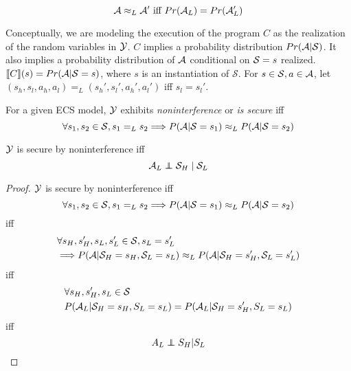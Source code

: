 \documentclass[../thesis.tex]{subfiles}
\begin{document}
\begin{dfn}
  $$\mathcal{A} \approx_L \mathcal{A}' \text{ iff } Pr(\mathcal{A}_L) = Pr
  (\mathcal{A}_L')$$
\end{dfn}

Conceptually, we are modeling the execution of the
program $C$ as the realization of the random variables in
$\mathcal{Y}$.
$C$ implies a probability distribution $Pr(\mathcal{A} \vert \mathcal{S})$.
It also implies a probability distribution of $\mathcal{A}$
conditional on $\mathcal{S} = s$ realized.
$\llbracket C\rrbracket(s) = Pr(\mathcal{A} \vert \mathcal{S} = s)$, where $s$ is an instantiation of $\mathcal{S}$.
For $s \in \mathcal{S}, a \in \mathcal{A}$, let
$(s_h,s_l,a_h,a_l) =_L (s_h',s_l',a_h',a_l')$
iff $s_l = s_l'$.

\begin{dfn}
  For a given ECS model, $\mathcal{Y}$
  exhibits \emph{noninterference} or \emph{is secure} iff
 $$\forall s_1,s_2  \in \mathcal{S}, s_1 =_L s_2 \Longrightarrow P(\mathcal{A} \vert \mathcal{S} = s_1) \approx_L P(\mathcal{A} \vert \mathcal{S} = s_2)$$
\end{dfn}

\begin{cor}\label{cor:noninterference-ind}
  $\mathcal{Y}$ is secure by noninterference iff
  $$\A_L \independent \mc{S}_H \given \mc{S}_L$$
\end{cor}
\begin{proof}
  $\mathcal{Y}$ is secure by noninterference iff
  $$\forall s_1,s_2  \in \mathcal{S}, s_1 =_L s_2 \Longrightarrow P(\mathcal{A} \vert \mathcal{S} = s_1) \approx_L P(\mathcal{A} \vert \mathcal{S} = s_2)$$
  iff
  \begin{equation}
    \begin{split}
      & \forall s_H,s_H',s_L,s_L'  \in \mathcal{S}, s_L = s_L' \\
      & \Longrightarrow P(\mathcal{A} \vert \mathcal{S}_H = s_H, \mathcal{S}_L = s_L) \approx_L P(\mathcal{A} \vert \mathcal{S}_H = s_H', \mathcal{S}_L = s_L')
    \end{split}
  \end{equation}
  iff
  \begin{equation}
    \begin{split}
      & \forall s_H,s_H',s_L \in \mathcal{S} \\
      & P(\mathcal{A}_L \vert \mathcal{S}_H = s_H, S_L = s_L) = P(\mathcal{A}_L \vert \mathcal{S}_H = s_H', S_L = s_L)
    \end{split}
  \end{equation}
  iff
  $$A_L \independent S_H \vert S_L$$
\end{proof}
\end{document}
